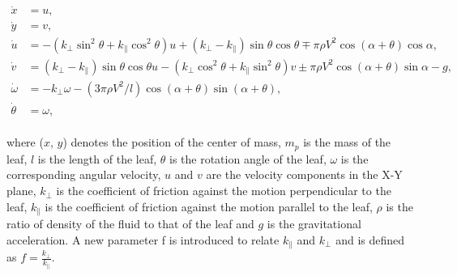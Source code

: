 \begin{equation}\label{eq:motion_eqns}
\begin{split}
\dot{x} & = u, \\
\dot{y} & = v, \\
\dot{u} & = -(k_{\perp}\sin^{2}\theta + k_{\parallel}\cos^{2}\theta)u + (k_{\perp}-k_{\parallel})\sin\theta \cos\theta \mp \pi\rho V^{2} \cos(\alpha + \theta) \cos\alpha, \\
\dot{v} & = (k_{\perp}-k_{\parallel})\sin\theta \cos\theta u - (k_{\perp}\cos^{2}\theta + k_{\parallel}\sin^{2}\theta)v \pm\pi\rho V^{2}\cos(\alpha+\theta)\sin\alpha - g, \\
\dot{\omega} & = -k_{\perp}\omega-(3\pi\rho V^{2}/l)\cos(\alpha + \theta)\sin(\alpha + \theta), \\
\dot{\theta} & = \omega, 
\end{split}
\end{equation}
\\
where ($x$, $y$) denotes the position of the center of mass, $m_{p}$ is the mass of the leaf, $l$ is the length of the leaf, $\theta$ is the rotation angle of the leaf, $\omega$ is the corresponding angular velocity, $u$ and $v$ are the velocity components in the X-Y plane, $k_{\perp}$ is the coefficient of friction against the motion perpendicular to the leaf, $k_{\parallel}$ is the coefficient of friction against the motion parallel to the leaf, $\rho$ is the ratio of density of the fluid to that of the leaf and $g$ is the gravitational acceleration. A new parameter f is introduced to relate $k_{\parallel}$ and $k_{\perp}$ and is defined as $f = \frac{k_{\perp}}{k_{\parallel}}$.

